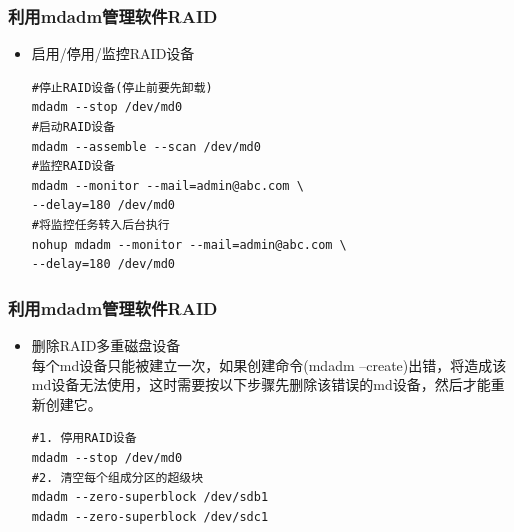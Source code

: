 \documentclass[xcolor=svgnames,presentation]{beamer}
\begin{document}
\begin{frame}[fragile]
\frametitle{利用mdadm管理软件RAID}
\label{sec-4-13}
\begin{itemize}

\item 启用/停用/监控RAID设备\\
\label{sec-4-13-1}%
\begin{verbatim}
#停止RAID设备(停止前要先卸载)
mdadm --stop /dev/md0
#启动RAID设备
mdadm --assemble --scan /dev/md0
#监控RAID设备
mdadm --monitor --mail=admin@abc.com \
--delay=180 /dev/md0
#将监控任务转入后台执行
nohup mdadm --monitor --mail=admin@abc.com \
--delay=180 /dev/md0
\end{verbatim}
\end{itemize} %
\end{frame}
\begin{frame}[fragile]
\frametitle{利用mdadm管理软件RAID}
\label{sec-4-14}
\begin{itemize}

\item 删除RAID多重磁盘设备\\
\label{sec-4-14-1}%
每个md设备只能被建立一次，如果创建命令(mdadm --create)出错，将造成该md设备无法使用，这时需要按以下步骤先删除该错误的md设备，然后才能重新创建它。

\begin{verbatim}
#1. 停用RAID设备
mdadm --stop /dev/md0
#2. 清空每个组成分区的超级块
mdadm --zero-superblock /dev/sdb1
mdadm --zero-superblock /dev/sdc1
\end{verbatim}
\end{itemize} %
\end{frame}
\end{document}
